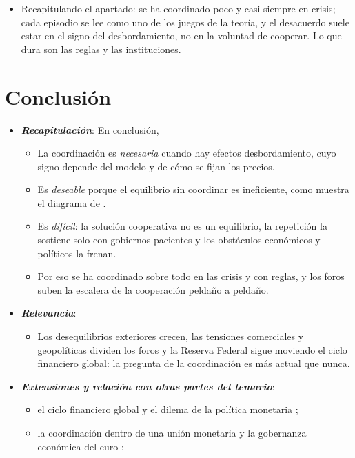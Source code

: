 \documentclass[11pt]{article}
\begin{document}
\begin{itemize}
\item Recapitulando el apartado: se ha coordinado poco y casi siempre en crisis; cada episodio se lee como uno de los juegos de la teoría, y el desacuerdo suele estar en el signo del desbordamiento, no en la voluntad de cooperar. Lo que dura son las reglas y las instituciones.
\end{itemize}

\section*{Conclusión}

\begin{itemize}
\item \textbf{\emph{Recapitulación}}: En conclusión,
  \begin{itemize}
  \item La coordinación es \emph{necesaria} cuando hay efectos desbordamiento, cuyo signo depende del modelo y de cómo se fijan los precios.
  \item Es \emph{deseable} porque el equilibrio sin coordinar es ineficiente, como muestra el diagrama de .
  \item Es \emph{difícil}: la solución cooperativa no es un equilibrio, la repetición la sostiene solo con gobiernos pacientes y los obstáculos económicos y políticos la frenan.
  \item Por eso se ha coordinado sobre todo en las crisis y con reglas, y los foros suben la escalera de la cooperación peldaño a peldaño.
  \end{itemize}
\item \textbf{\emph{Relevancia}}:
  \begin{itemize}
  \item Los desequilibrios exteriores crecen, las tensiones comerciales y geopolíticas dividen los foros y la Reserva Federal sigue moviendo el ciclo financiero global: la pregunta de la coordinación es más actual que nunca.
  \end{itemize}
\item \textbf{\emph{Extensiones y relación con otras partes del temario}}:
  \begin{itemize}
  \item el ciclo financiero global y el dilema de la política monetaria ;
  \item la coordinación dentro de una unión monetaria y la gobernanza económica del euro  ;

\end{itemize}
\end{itemize}
\end{document}
